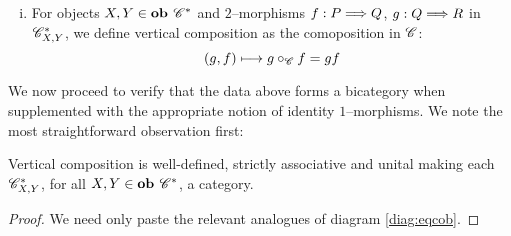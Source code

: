 \documentclass[./Thick_TQFTs_and_Quantum_Information.tex]{subfiles}
\begin{document}
\begin{defn}
\begin{enumerate}[(i)]
\item For objects $X, Y \in \textbf{ob } \mathscr{C}^*$ and $2$--morphisms
$f : P \stackrel{}{\Longrightarrow} Q$, $g : Q \stackrel{}{\Longrightarrow} R$ in $\mathscr{C}^*_{X, Y}$, we define vertical
composition as the comoposition in $\mathscr{C}$:
\[
  (g, f) \longmapsto g \circ_{\mathscr{C}} f = gf
\]

\end{enumerate}
\end{defn}

We now proceed to verify that the data above forms a bicategory when
supplemented with the appropriate notion of identity $1$--morphisms. We note the
most straightforward observation first:
\begin{lem}
Vertical composition is well-defined, strictly associative and unital making
each $\mathscr{C}^*_{X, Y}$, for all $X, Y \in \textbf{ob } \mathscr{C}^*$, a category.
\end{lem}
\begin{proof}
We need only paste the relevant analogues of diagram \eqref{diag:eqcob}.
\end{proof}
\end{document}
